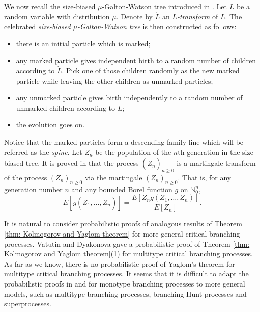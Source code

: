 \documentclass[UTF8]{pkuthss}
\theoremstyle{plain}
\theoremstyle{definition}
\numberwithin{equation}{section}
\begin{document}
We now recall the size-biased $\mu$-Galton-Watson tree introduced in \cite{LyonsPemantlePeres1995Conceptual}.
Let $L$ be a random variable with distribution $\mu$.
Denote by $\dot L$ an \emph{$L$-transform} of $L$.
The celebrated \emph{size-biased $\mu$-Galton-Watson tree} is then constructed as follows:
\begin{itemize}
	\item
	there is an initial particle which is marked;
	\item
	any marked particle gives independent birth to a random number of children according to $\dot L$. Pick one of those children randomly as the new marked particle while leaving the other children as unmarked particles;
	\item
	any unmarked particle gives
	birth independently to a random number of unmarked children according to $L$;
	\item
	the evolution goes on.
\end{itemize}

Notice that the marked particles form a descending family line which will be referred as the \emph{spine}.
Let $\dot Z_n$ be the population of the $n$th generation in the size-biased tree.
It is proved in \cite{LyonsPemantlePeres1995Conceptual} that the process $(\dot Z_n)_{n\ge 0}$ is a martingale transform of the process $(Z_n)_{n\ge 0}$ via the martingale $(Z_n)_{n\ge 0}.$
That is, for any generation number $n$ and any bounded Borel function $g$ on $\mathbb N_0^{n}$,
\begin{equation}
\label{eq:htransformation}
E [ g ( \dot Z_1, \dots, \dot Z_n) ]
= \frac { E[ Z_n g( Z_1, \dots, Z_n)]} {E [ Z_n]}.
\end{equation}

It is natural to consider probabilistic proofs of analogous results of Theorem \ref{thm: Kolmogorov and Yaglom theorem} for more general critical branching processes.
Vatutin and  Dyakonova \cite{VatutinDyakonova2001Survival} gave a probabilistic proof of Theorem \ref{thm: Kolmogorov and Yaglom theorem}(1) for multitype critical branching processes.
As far as we know, there is no probabilistic proof of Yaglom's theorem for multitype critical branching processes.
It seems that it is difficult to adapt the probabilistic proofs in \cite{Geiger2000New} and \cite{LyonsPemantlePeres1995Conceptual} for monotype branching processes to more general models, such as multitype branching processes, branching Hunt processes and superprocesses.
\end{document}

